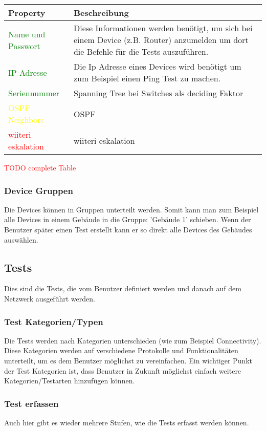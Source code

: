 \documentclass[
	ngerman,
	toc=listof, %
	toc=bibliography, %
	footnotes=multiple, %
	parskip=half, %
	numbers=noendperiod %
]{scrartcl}
\begin{document}
			\begin{tabularx}{\textwidth}{lX}
				\toprule
				Property & Beschreibung\\
				\midrule
				\textcolor{green}{Name und Passwort} & Diese Informationen werden benötigt, um sich bei einem Device (z.B. Router) anzumelden um dort die Befehle für die Tests auszuführen. \\	
				\textcolor{green}{IP Adresse} & Die Ip Adresse eines Devices wird benötigt um zum Beispiel einen Ping Test zu machen. \\
				\textcolor{green}{Seriennummer} & Spanning Tree bei Switches als deciding Faktor \\
				\midrule
				\textcolor{yellow}{OSPF Neighbors} & OSPF \\
				\midrule
				\textcolor{red}{wiiteri eskalation} & wiiteri eskalation \\				
				\bottomrule
			\end{tabularx}

			\textcolor{red}{TODO complete Table}

		\subsubsection{Device Gruppen}
			Die Devices können in Gruppen unterteilt werden. Somit kann man zum Beispiel alle Devices in einem Gebäude in die Gruppe: 'Gebäude 1' schieben.
			Wenn der Benutzer später einen Test erstellt kann er so direkt alle Devices des Gebäudes auswählen. 

	\subsection{Tests}
		Dies sind die Tests, die vom Benutzer definiert werden und danach auf dem Netzwerk ausgeführt werden.
		
		\subsubsection{Test Kategorien/Typen}
			Die Tests werden nach Kategorien unterschieden (wie zum Beispiel Connectivity). Diese Kategorien werden auf verschiedene Protokolle und Funktionalitäten unterteilt, um es dem Benutzer möglichst zu vereinfachen.
			Ein wichtiger Punkt der Test Kategorien ist, dass Benutzer in Zukunft möglichst einfach weitere Kategorien/Testarten hinzufügen können.

		\subsubsection{Test erfassen}
			Auch hier gibt es wieder mehrere Stufen, wie die Tests erfasst werden können.\\
\end{document}
